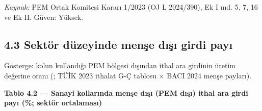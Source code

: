 \emph{Kaynak:} \etiketV{} PEM Ortak Komitesi Kararı 1/2023 (OJ L 2024/390), Ek I md. 5, 7, 16 ve Ek II. Güven: Yüksek.

\hypertarget{02c_hazirlik-43-sektuxf6r-duxfczeyinde-menux15fe-dux131ux15fux131-girdi-payux131}{%
\subsection{4.3 Sektör düzeyinde menşe dışı girdi payı}\label{02c_hazirlik-43-sektuxf6r-duxfczeyinde-menux15fe-dux131ux15fux131-girdi-payux131}}

Gösterge: kolun kullandığı PEM bölgesi dışından ithal ara girdinin üretim değerine oranı (; TÜİK 2023 ithalat G-Ç tablosu × BACI 2024 menşe payları).


\textbf{Tablo 4.2 --- Sanayi kollarında menşe dışı (PEM dışı) ithal ara girdi payı (\%; sektör ortalaması)}

\nopagebreak[4]

\begingroup\gbtablo\footnotesize

